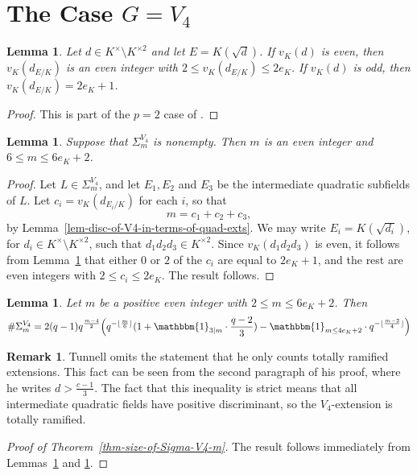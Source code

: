 \documentclass[11pt]{amsart}
\theoremstyle{theorem}
\newtheorem{lemma}[theorem]{Lemma}
\theoremstyle{example}
\theoremstyle{definition}
\newtheorem{remark}[theorem]{Remark}
\numberwithin{theorem}{section}
\numberwithin{theorem}{section}
\begin{document}
\section{The Case $G = V_4$}
\label{sec-G=V4}


\begin{lemma}
    \label{lem-half-of-hecke}
    Let $d \in K^\times\setminus K^{\times 2}$ and let $E = K(\sqrt{d})$. If $v_K(d)$ is even, then $v_K(d_{E/K})$ is an even integer with $2 \leq v_K(d_{E/K})\leq 2e_K$. If $v_K(d)$ is odd, then $v_K(d_{E/K}) = 2e_K + 1$.
\end{lemma}
\begin{proof}
    This is part of the $p=2$ case of \cite[Theorem~2.4]{hecke-theorem}.
\end{proof}


\begin{lemma}
    \label{lem-V4-ext-implies-even-m}
    Suppose that $\Sigma_m^{V_4}$ is nonempty. Then $m$ is an even integer and $6 \leq m \leq 6e_K + 2$. 
\end{lemma}
\begin{proof}
    Let $L \in \Sigma_m^{V_4}$, and let $E_1, E_2$ and $E_3$ be the intermediate quadratic subfields of $L$. Let $c_i = v_K(d_{E_i/K})$ for each $i$, so that
    $$
    m = c_1 + c_2 + c_3,
    $$
    by Lemma~\ref{lem-disc-of-V4-in-terms-of-quad-exts}.
    We may write $E_i = K(\sqrt{d_i})$, for $d_i \in K^\times\setminus K^{\times 2}$, such that $d_1d_2d_3 \in K^{\times 2}$.  Since $v_K(d_1d_2d_3)$ is even, it follows from Lemma~\ref{lem-half-of-hecke} that either $0$ or $2$ of the $c_i$ are equal to $2e_K + 1$, and the rest are even integers with $2 \leq c_i \leq 2e_K$. The result follows. 
\end{proof}

\begin{lemma}
    \label{lem-size-Sigma_V4-m}
{\cite[Lemma~4.7]{tunnell}} Let $m$ be a positive even integer with $2 \leq m \leq 6e_K + 2$. Then 
$$
\#\Sigma_m^{V_4} = 2(q-1)q^{\frac{m-4}{2}}\Big(
    q^{-\lfloor \frac{m}{6}\rfloor}(1 + \mathbbm{1}_{3 \mid m}\cdot \frac{q-2}{3}) - \mathbbm{1}_{m\leq 4e_K + 2}\cdot q^{-\lfloor\frac{m-2}{4}\rfloor}
\Big)
$$
\end{lemma}
\begin{remark}
    Tunnell omits the statement that he only counts totally ramified extensions. This fact can be seen from the second paragraph of his proof, where he writes $d > \frac{c-1}{3}$. The fact that this inequality is strict means that all intermediate quadratic fields have positive discriminant, so the $V_4$-extension is totally ramified. 
\end{remark}
\begin{proof}[Proof of Theorem~\ref{thm-size-of-Sigma-V4-m}]
    The result follows immediately from Lemmas~\ref{lem-V4-ext-implies-even-m} and \ref{lem-size-Sigma_V4-m}.
\end{proof}
\end{document}
